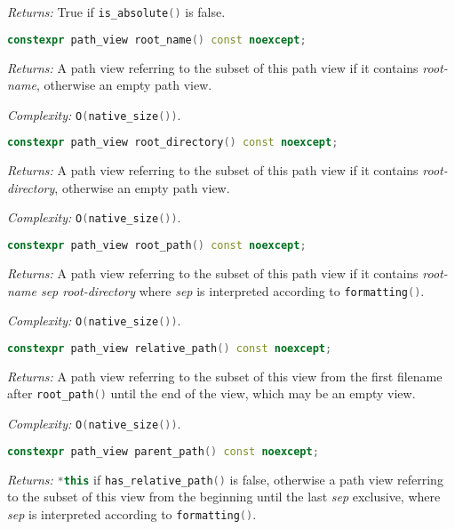 \documentclass[11pt]{article}
\newcommand{\code}[2][cpp]{\lstinline[language=#1,basicstyle=\small\ttfamily]{#2}}
\newcommand{\desc}[1]{\textit{#1}}
\newcommand{\returns}{\desc{Returns: }}
\newcommand{\complexity}{\desc{Complexity: }}
\begin{document}
\returns True if \code{is_absolute()} is false.\\

\begin{lstlisting}[language=cpp]
    constexpr path_view root_name() const noexcept;
\end{lstlisting}

\returns A path view referring to the subset of this path view if it contains \emph{root-name}, otherwise an empty path view.

\complexity \code{O(native_size())}.\\

\begin{lstlisting}[language=cpp]
    constexpr path_view root_directory() const noexcept;
\end{lstlisting}

\returns A path view referring to the subset of this path view if it contains \emph{root-directory}, otherwise an empty path view.

\complexity \code{O(native_size())}.\\

\begin{lstlisting}[language=cpp]
    constexpr path_view root_path() const noexcept;
\end{lstlisting}

\returns A path view referring to the subset of this path view if it contains \emph{root-name sep root-directory} where \emph{sep} is interpreted according to \code{formatting()}.

\complexity \code{O(native_size())}.\\

\begin{lstlisting}[language=cpp]
    constexpr path_view relative_path() const noexcept;
\end{lstlisting}

\returns A path view referring to the subset of this view from the first filename after \code{root_path()} until the end of the view, which may be an empty view.

\complexity \code{O(native_size())}.\\

\begin{lstlisting}[language=cpp]
    constexpr path_view parent_path() const noexcept;
\end{lstlisting}

\returns \code{*this} if \code{has_relative_path()} is false, otherwise a path view referring to the subset of this view from the beginning until the last \emph{sep} exclusive, where \emph{sep} is interpreted according to \code{formatting()}.
\end{document}

